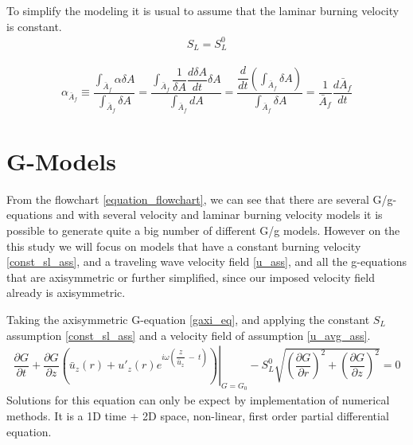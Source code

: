 \begin{assumption}
To simplify the modeling it is usual to assume that the laminar burning velocity is constant.
\begin{align}
	S_L=S_L^0
\end{align}
\label{const_sl_ass}
\end{assumption}


\begin{assumption}
\begin{align*}
	\alpha_{\bar{A}_f} \equiv \dfrac{\int_{\bar{A}_f} \alpha \delta A}{\int_{\bar{A}_f} \delta A}= \dfrac{\int_{\bar{A}_f} \dfrac{1}{\delta A}\dfrac{d \delta A}{d t}\delta A}{\int_{\bar{A}_f} dA}= \dfrac{\dfrac{d}{dt} \left( \int_{\bar{A}_f}\delta A \right)}{\int_{\bar{A}_f}\delta A}=\dfrac{1}{\bar{A}_f}\dfrac{d \bar{A}_f}{dt} 	
\end{align*}
\end{assumption}








\newpage
\section{G-Models}
From the flowchart \ref{equation_flowchart}, we can see that there are several G/g-equations and with several velocity and laminar burning velocity models it is possible to generate quite a big number of different G/g models. However on the this study we will focus on models that have a constant burning velocity \ref{const_sl_ass}, and a traveling wave velocity field \ref{u_ass}, and all the g-equations that are axisymmetric or further simplified, since our imposed velocity field already is axisymmetric.
\begin{theorem}
Taking the axisymmetric G-equation \eqref{gaxi_eq}, and applying the constant $S_L$ assumption \ref{const_sl_ass} and a velocity field of assumption \ref{u_avg_ass}.
\begin{align}
	\dfrac{\partial G}{\partial t} +  \dfrac{\partial G}{\partial z} \left. \left(\bar{u}_z(r) + u'_z(r)e^{i\omega\left(\dfrac{z}{\bar{u}_z}\ -\ t\right)} \right)\right|_{G=G_0} - S_L^0 \sqrt{ \left(\dfrac{\partial G}{\partial r}\right)^2 + \left(\dfrac{\partial G}{\partial z}\right)^2 }=0 
\end{align}
Solutions for this equation can only be expect by implementation of numerical methods. It is a 1D time + 2D space, non-linear, first order partial differential equation.
\end{theorem}

